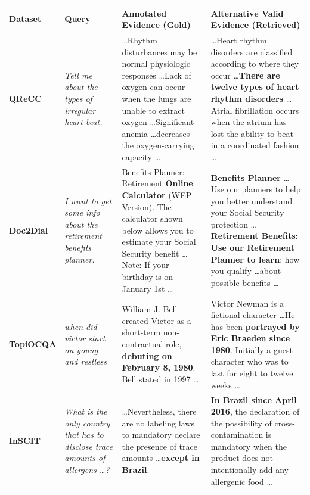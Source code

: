 \begin{table}[ht]
\small
\centering

\renewcommand{\arraystretch}{1.5}
\begin{tabularx}{\textwidth}{p{1.6cm} p{3.2cm} X X}
\toprule
\textbf{Dataset} & \textbf{Query} & \textbf{Annotated Evidence (Gold)} & \textbf{Alternative Valid Evidence (Retrieved)} \\
\midrule

\textbf{QReCC} & 
\textit{Tell me about the types of irregular heart beat.} & 
\dots Rhythm disturbances may be normal physiologic responses \dots Lack of oxygen can occur when the lungs are unable to extract oxygen \dots Significant anemia \dots decreases the oxygen-carrying capacity \dots & 
\dots Heart rhythm disorders are classified according to where they occur \dots \textbf{There are twelve types of heart rhythm disorders} \dots Atrial fibrillation occurs when the atrium has lost the ability to beat in a coordinated fashion \dots \\
\midrule

\textbf{Doc2Dial} & 
\textit{I want to get some info about the retirement benefits planner.} & 
Benefits Planner: Retirement \textbf{Online Calculator} (WEP Version). The calculator shown below allows you to estimate your Social Security benefit \dots Note: If your birthday is on January 1st \dots & 
\textbf{Benefits Planner} \dots Use our planners to help you better understand your Social Security protection \dots \textbf{Retirement Benefits: Use our Retirement Planner to learn}: how you qualify \dots about possible benefits \dots \\
\midrule

\textbf{TopiOCQA} & 
\textit{when did victor start on young and restless} & 
William J. Bell created Victor as a short-term non-contractual role, \textbf{debuting on February 8, 1980}. Bell stated in 1997 \dots & 
 Victor Newman is a fictional character \dots He has been \textbf{portrayed by Eric Braeden since 1980}. Initially a guest character who was to last for eight to twelve weeks \dots \\
\midrule

\textbf{InSCIT} & 
\textit{What is the only country that has to disclose trace amounts of allergens \dots?} & 
\dots Nevertheless, there are no labeling laws to mandatory declare the presence of trace amounts \dots \textbf{except in Brazil}. & 
 \textbf{In Brazil since April 2016}, the declaration of the possibility of cross-contamination is mandatory when the product does not intentionally add any allergenic food \dots \\
\midrule


\end{tabularx}
\end{table}
